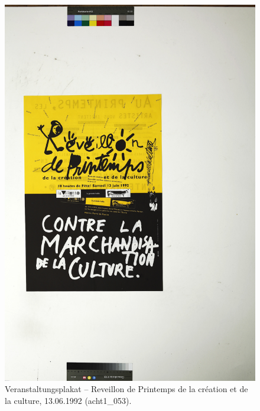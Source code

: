 \documentclass[a4paper,12pt,ngerman]{article}
\begin{document}
\newpage
\begin{figure}[ht]
\includegraphics[width=\linewidth]{Abbildung_43_(acht1_053)}
\centering
\caption{Veranstaltungsplakat – Reveillon de Printemps de la création et de la culture, 13.06.1992 (acht1\_053).}
\end{figure}
\end{document}
